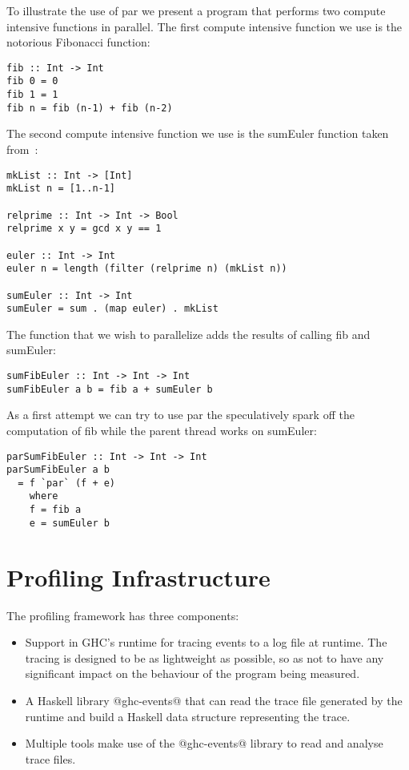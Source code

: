 \documentclass[twocolumn,9pt]{sigplanconf}
\newcommand{\codef}[1]{{\fontfamily{cmss}\small#1}}
\begin{document}
To illustrate the use of \codef{par} we present a program that performs two compute intensive functions in parallel. The first compute intensive function we use is the notorious Fibonacci function:
\begin{lstlisting}
fib :: Int -> Int
fib 0 = 0
fib 1 = 1
fib n = fib (n-1) + fib (n-2)
\end{lstlisting}
The second compute intensive function we use is the \codef{sumEuler} function taken from~\cite{trinder:02}:
\begin{lstlisting}
mkList :: Int -> [Int]
mkList n = [1..n-1]

relprime :: Int -> Int -> Bool
relprime x y = gcd x y == 1

euler :: Int -> Int
euler n = length (filter (relprime n) (mkList n))

sumEuler :: Int -> Int
sumEuler = sum . (map euler) . mkList
\end{lstlisting}
The function that we wish to parallelize adds the results of calling \codef{fib} and \codef{sumEuler}:
\begin{lstlisting}
sumFibEuler :: Int -> Int -> Int
sumFibEuler a b = fib a + sumEuler b
\end{lstlisting}
As a first attempt we can try to use \codef{par} the speculatively spark off the computation of \codef{fib} while the parent thread works on \codef{sumEuler}:
\begin{lstlisting}
parSumFibEuler :: Int -> Int -> Int
parSumFibEuler a b
  = f `par` (f + e)
    where
    f = fib a
    e = sumEuler b
\end{lstlisting}

\section{Profiling Infrastructure}

The profiling framework has three components:

\begin{itemize}
\item Support in GHC's runtime for tracing events to a log file at
  runtime.  The tracing is designed to be as lightweight as possible,
  so as not to have any significant impact on the behaviour of the
  program being measured.

\item A Haskell library @ghc-events@ that can read the trace file
  generated by the runtime and build a Haskell data structure
  representing the trace.

\item Multiple tools make use of the @ghc-events@ library to read and
  analyse trace files.
\end{itemize}
\end{document}
